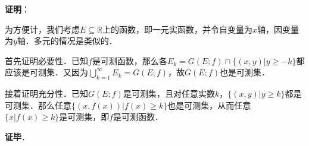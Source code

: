\textbf{证明}：

为方便计，我们考虑$E\subseteq\mathbb{R}$上的函数，即一元实函数，并令自变量为$x$轴，因变量为$y$轴．多元的情况是类似的．

首先证明必要性．已知$f$是可测函数，那么各$E_k=G(E; f)\cap\{(x, y)|y\geq -k\}$都应该是可测集．又因为$\bigcup^\infty_{k=1} E_k=G(E; f)$，故$G(E; f)$也是可测集．

接着证明充分性．已知$G(E; f)$是可测集，且对任意实数$k$，$\{(x, y)|y\geq k\}$都是可测集．那么任意$\{(x, f(x))|f(x)\geq k\}$也是可测集，从而任意$\{x|f(x)\geq k\}$是可测集，即$f$是可测函数．

\textbf{证毕}．



